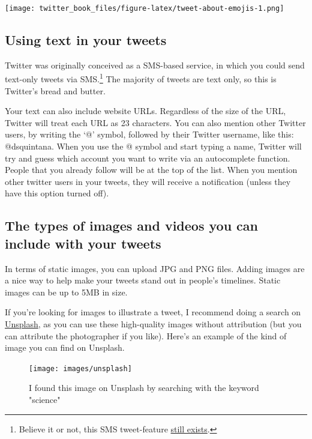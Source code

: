 \documentclass[
]{book}
\begin{document}
\texttt{[image: twitter\_book\_files/figure-latex/tweet-about-emojis-1.png]}

\hypertarget{using-text-in-your-tweets}{%
\subsection{Using text in your tweets}\label{using-text-in-your-tweets}}

Twitter was originally conceived as a SMS-based service, in which you could send text-only tweets via SMS.\footnote{Believe it or not, this SMS tweet-feature \href{https://help.twitter.com/en/using-twitter/twitter-sms}{still exists}.} The majority of tweets are text only, so this is Twitter's bread and butter.

Your text can also include website URLs. Regardless of the size of the URL, Twitter will treat each URL as 23 characters. You can also mention other Twitter users, by writing the `@' symbol, followed by their Twitter username, like this: @dsquintana. When you use the @ symbol and start typing a name, Twitter will try and guess which account you want to write via an autocomplete function. People that you already follow will be at the top of the list. When you mention other twitter users in your tweets, they will receive a notification (unless they have this option turned off).

\hypertarget{the-types-of-images-and-videos-you-can-include-with-your-tweets}{%
\subsection{The types of images and videos you can include with your tweets}\label{the-types-of-images-and-videos-you-can-include-with-your-tweets}}

In terms of static images, you can upload JPG and PNG files. Adding images are a nice way to help make your tweets stand out in people's timelines. Static images can be up to 5MB in size.

If you're looking for images to illustrate a tweet, I recommend doing a search on \href{https://unsplash.com/}{Unsplash}, as you can use these high-quality images without attribution (but you can attribute the photographer if you like). Here's an example of the kind of image you can find on Unsplash.

\begin{figure}

\texttt{[image: images/unsplash]} \hfill{}

\caption{I found this image on Unsplash by searching with the keyword "science"}\label{fig:unnamed-chunk-7}
\end{figure}
\end{document}
